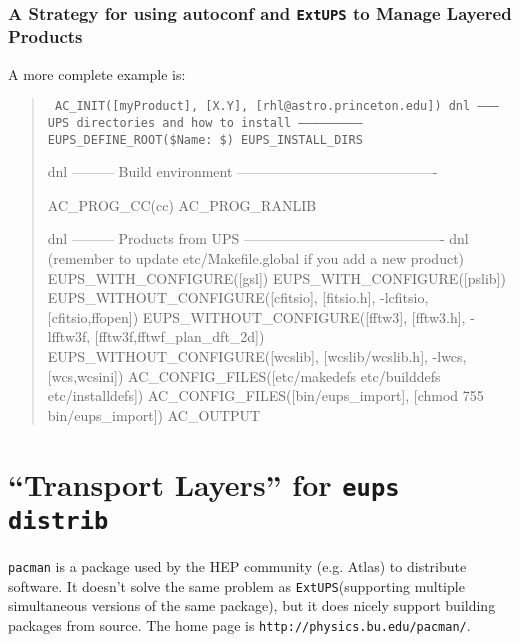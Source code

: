 \documentclass{article}
\newcommand{\code}[1]{\texttt{#1}}
\newcommand{\eups}{\code{ExtUPS}\xspace}
\newcommand{\pacman}{\code{pacman}}
\begin{document}
\subsubsection{A Strategy for using autoconf and \eups to Manage Layered Products}


A more complete example is:

\begin{quote}
    \obeylines\tt\small\parskip=0pt
AC\_INIT([myProduct], [X.Y], [rhl@astro.princeton.edu])
\vspace{5pt}
dnl --------- UPS directories and how to install --------------------------
\vspace{5pt}
EUPS\_DEFINE\_ROOT(\${Name}:  \$)
EUPS\_INSTALL\_DIRS   
\vspace{5pt}

dnl --------- Build environment -------------------------------------------

AC\_PROG\_CC(cc)
AC\_PROG\_RANLIB

dnl --------- Products from UPS -------------------------------------------
dnl (remember to update etc/Makefile.global if you add a new product)
\vspace{5pt}
EUPS\_WITH\_CONFIGURE([gsl])
EUPS\_WITH\_CONFIGURE([pslib])
\vspace{5pt}
EUPS\_WITHOUT\_CONFIGURE([cfitsio], [fitsio.h],
                        -lcfitsio, [cfitsio,ffopen])
EUPS\_WITHOUT\_CONFIGURE([fftw3],   [fftw3.h],
                        -lfftw3f,  [fftw3f,fftwf\_plan\_dft\_2d])
EUPS\_WITHOUT\_CONFIGURE([wcslib],  [wcslib/wcslib.h],
                        -lwcs,     [wcs,wcsini])
\vspace{5pt}
AC\_CONFIG\_FILES([etc/makedefs etc/builddefs etc/installdefs])
AC\_CONFIG\_FILES([bin/eups\_import], [chmod 755 bin/eups\_import])
\vspace{5pt}
AC\_OUTPUT
\end{quote}

\section{``Transport Layers'' for \code{eups distrib}}
\label{pacman}

\pacman{} is a package used by the HEP community (e.g. Atlas) to distribute
software.  It doesn't solve the same problem as \eups (supporting 
multiple simultaneous versions of the same package), but it does nicely
support building packages from source.  The home page is \code{http://physics.bu.edu/pacman/}.
\end{document}
